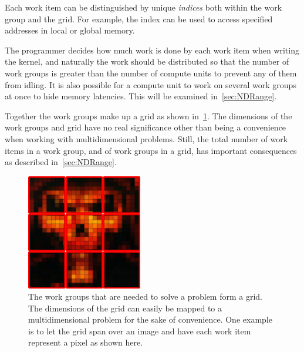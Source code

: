 \documentclass[11pt,twoside]{report}
\begin{document}

\indent Each work item can be distinguished by unique {\it indices} both within the work group and the grid. For example, the index can be used to access specified addresses in local or global memory.


\indent The programmer decides how much work is done by each work item when writing the kernel, and naturally the work should be distributed so that the number of work groups is greater than the number of compute units to prevent any of them from idling. 
It is also possible for a compute unit to work on several work groups at once to hide memory latencies. This  will be examined in~\cref{sec:NDRange}.

\indent Together the work groups make up a grid as shown in~\cref{fig:the_grid}. The dimensions of the work groups and grid have no real significance other than being a convenience when working with multidimensional problems. Still, the total number of work items in a work group,  and of work groups in a grid, has important consequences as described in~\cref{sec:NDRange}.

\begin{figure}[htbp]
	\begin{center}
	\vspace{-10pt}
  \includegraphics[width=0.45\textwidth]{img/grid_lol.png}
	\end{center}
  \caption{The work groups that are needed to solve a problem form a grid. The dimensions of the grid can easily be mapped to a multidimensional problem for the sake of convenience. One example is to let the grid span over an image and have each work item represent a pixel as shown here.}
	\label{fig:the_grid}
	\vspace{-5pt}
\end{figure}
\end{document}
